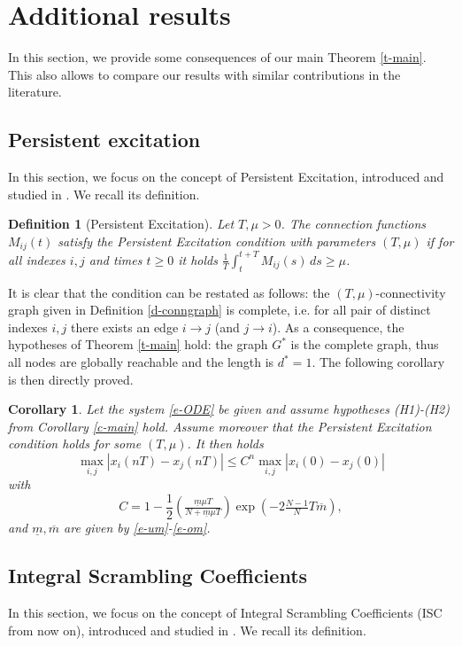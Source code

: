 \documentclass[journal]{article}
\newtheorem{corollary}[theorem]{Corollary}
\newtheorem{definition}[lemma]{Definition}
\begin{document}
\section{Additional results}
\label{s-consequences}

In this section, we provide some consequences of our main Theorem \ref{t-main}. This also allows to compare our results with similar contributions in the literature.

\subsection{Persistent excitation}

In this section, we focus on the concept of Persistent Excitation, introduced and studied in \cite{narendra2012stable,ChSi2010,ChSi2014,ren2008distributed,tang2020bearing,manfredi2016criterion,bonnet2021consensus,anderson2016convergence,chaillet2008uniform}. We recall its definition.

\begin{definition}[Persistent Excitation] Let $T,\mu>0$. The connection functions $M_{ij}(t)$ satisfy the Persistent Excitation condition with parameters $(T,\mu)$ if for all indexes $i,j$ and times $t\geq 0$ it holds $\frac1T \int_t^{t+T}M_{ij}(s)\,ds\geq \mu$.
\end{definition}

It is clear that the condition can be restated as follows: the $(T,\mu)$-connectivity graph given in Definition \ref{d-conngraph} is complete, i.e. for all pair of distinct indexes $i,j$ there exists an edge $i\to j$ (and $j\to i$). As a consequence, the hypotheses of Theorem \ref{t-main} hold: the graph $G^*$ is the complete graph, thus all nodes are globally reachable and the length is $d^*=1$. The following corollary is then directly proved.

\begin{corollary} Let the system \eqref{e-ODE} be given and assume hypotheses (H1)-(H2) from Corollary \ref{c-main} hold. Assume moreover that the Persistent Excitation condition holds for some $(T,\mu)$. It then holds 
$$\max_{i,j}|x_i(nT)-x_j(nT)|\leq C^n \max_{i,j}|x_i(0)-x_j(0)|$$
with 
$$C=1-\frac12 \left( \tfrac{\underline{m}\mu T}{N+\underline{m}\mu T}    \right)\exp(-2\tfrac{N-1}{N}T\overline{m}),$$
and $\underline{m},\overline{m}$ are given by \eqref{e-um}-\eqref{e-om}.


\end{corollary}

\subsection{Integral Scrambling Coefficients} \label{s-ISC}
In this section, we focus on the concept of Integral Scrambling Coefficients (ISC from now on), introduced and studied in \cite{bonnet2023consensus,bonnet2022consensus}. We recall its definition.
\end{document}

